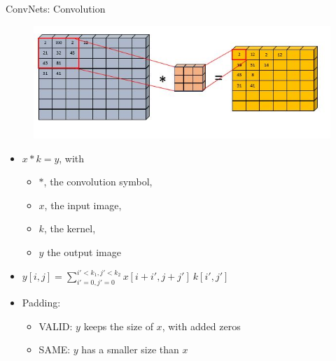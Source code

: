\documentclass{beamer}
\begin{document}
\begin{frame}{ConvNets: Convolution}

\begin{figure}
    \centering
    \includegraphics[scale=0.6]{images/convolutionkernel.JPG}
\end{figure}
\vspace*{-1cm}
\begin{itemize}
\item $x * k = y$, with 
\begin{itemize}
    \item $*$, the convolution symbol,
    \item $x$, the input image,
    \item $k$, the kernel,
    \item $y$ the output image
\end{itemize}
\vfill
\item $y[i,j] = \sum_{i'=0,j'=0} ^{i'<k_1,j'<k_2} x[i+i',j+j'] \ k[i',j']$
\vfill
\item Padding:
\begin{itemize}
    \item \textsc{VALID}: $y$ keeps the size of $x$, with added zeros
    \item \textsc{SAME}: $y$ has a smaller size than $x$
\end{itemize}
\end{itemize}
    
\end{frame}
\end{document}

